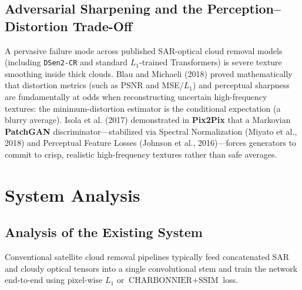 \documentclass[12pt,a4paper]{report}
\begin{document}
\section{Adversarial Sharpening and the Perception--Distortion Trade-Off}
A pervasive failure mode across published SAR-optical cloud removal models (including \texttt{DSen2-CR} and standard $L_1$-trained Transformers) is severe texture smoothing inside thick clouds. Blau and Michaeli (2018) proved mathematically that distortion metrics (such as PSNR and MSE/$L_1$) and perceptual sharpness are fundamentally at odds when reconstructing uncertain high-frequency textures: the minimum-distortion estimator is the conditional expectation (a blurry average). Isola et al. (2017) demonstrated in \textbf{Pix2Pix} that a Markovian \textbf{PatchGAN} discriminator---stabilized via Spectral Normalization (Miyato et al., 2018) and Perceptual Feature Losses (Johnson et al., 2016)---forces generators to commit to crisp, realistic high-frequency textures rather than safe averages.

\chapter{System Analysis}

\section{Analysis of the Existing System}
Conventional satellite cloud removal pipelines typically feed concatenated SAR and cloudy optical tensors into a single convolutional stem and train the network end-to-end using pixel-wise $L_1$ or $\text{CHARBONNIER} + \text{SSIM}$ loss.
\end{document}
